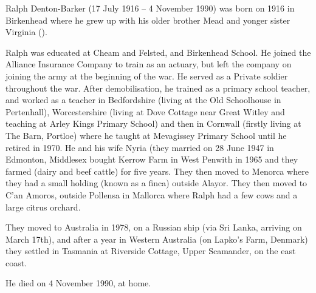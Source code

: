 
Ralph Denton-Barker (17 July 1916 -- 4 November 1990) was born on 1916 in Birkenhead \cite{BMDIndex_RalphMundayDentonBarker_birth} where he grew up with his older brother Mead and yonger sister Virginia ().

Ralph was educated at Cheam and Felsted, and Birkenhead School. He joined the Alliance Insurance Company to train as an actuary, but left the company on joining the army at the beginning of the war. He served as a Private soldier throughout the war. After demobilisation, he trained as a primary school teacher, and worked as a teacher in Bedfordshire (living at the Old Schoolhouse in Pertenhall), Worcestershire (living at Dove Cottage near Great Witley and teaching at Arley Kings Primary School) and then in Cornwall (firstly living at The Barn, Portloe) where he taught at Mevagissey Primary School until he retired in 1970.  He and his wife Nyria (they married on 28 June 1947 in Edmonton, Middlesex \cite{MarriageCertRalphDentonBarkerJoanNyriaPowell} bought Kerrow Farm in West Penwith in 1965 and they farmed (dairy and beef cattle) for five years. They then moved to Menorca where they had a small holding (known as a finca) outside Alayor. They then moved to C'an Amoros, outside Pollensa in Mallorca where Ralph had a few cows and a large citrus orchard.

They moved to Australia in 1978, on a Russian ship (via Sri Lanka, arriving on March 17th), and after a year in Western Australia (on Lapko's Farm, Denmark) they settled in Tasmania at Riverside Cottage, Upper Scamander, on the east coast.

He died on 4 November 1990, at home.

